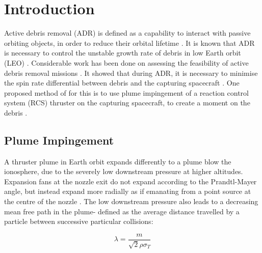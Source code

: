\documentclass[journal]{new-aiaa}
\begin{document}
\section{Introduction}
\label{sec-introduction}


Active debris removal (ADR) is defined as a capability to interact with passive orbiting objects, in order to reduce their orbital lifetime \cite{steeringgroupIADCStatementActive2022a}. It is known that ADR is necessary to control the unstable growth rate of debris in low Earth orbit (LEO) \cite{inter-agencyspacedebriscoordinationcommitteePeacefulUsesOuter1993} \cite{bastidavirgiliActiveDebrisRemoval2013}. Considerable work has been done on assessing the feasibility of active debris removal missions \cite{ledkovReviewContactContactless2022,bonnalActiveDebrisRemoval2013}. It showed that during ADR, it is necessary to minimise the spin rate differential between debris and the capturing spacecraft \cite{shanReviewComparisonActive2016}. One proposed method of for this is to use plume impingement of a reaction control system (RCS) thruster on the capturing spacecraft, to create a moment on the debris \cite{peters2016applicability,ferrariGASPLUMEIMPINGEMENT2014}. 

\subsection{Plume Impingement}

A thruster plume in Earth orbit expands differently to a plume blow the ionosphere, due to the severely low downstream pressure at higher altitudes. Expansion fans at the nozzle exit do not expand according to the Prandtl-Mayer angle, but instead expand more radially as if emanating from a point source at the centre of the nozzle \cite{mehtaUnderexpandedSupersonicPlume2011}. The low downstream pressure also leads to a decreasing mean free path in the plume- defined as the average distance travelled by a particle between successive particular collisions:

\begin{equation}
  \lambda = \frac{m}{\sqrt{2} \rho {\sigma}_T} 
  \label{intro_eq_meanFreePath}
\end{equation}
\end{document}
